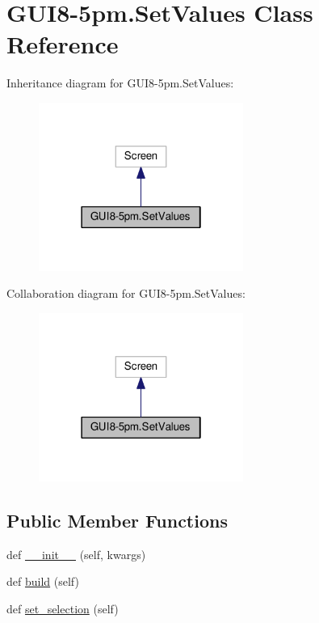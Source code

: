 \hypertarget{classGUI8-5pm_1_1SetValues}{}\section{G\+U\+I8-\/5pm.Set\+Values Class Reference}
\label{classGUI8-5pm_1_1SetValues}


Inheritance diagram for G\+U\+I8-\/5pm.Set\+Values\+:\nopagebreak
\begin{figure}[H]
\begin{center}
\leavevmode
\includegraphics[width=190pt]{classGUI8-5pm_1_1SetValues__inherit__graph}
\end{center}
\end{figure}


Collaboration diagram for G\+U\+I8-\/5pm.Set\+Values\+:\nopagebreak
\begin{figure}[H]
\begin{center}
\leavevmode
\includegraphics[width=190pt]{classGUI8-5pm_1_1SetValues__coll__graph}
\end{center}
\end{figure}
\subsection*{Public Member Functions}
\begin{DoxyCompactItemize}
\item 
def \hyperlink{classGUI8-5pm_1_1SetValues_afe186284aaf655e182eb4a0db6ad88c2}{\+\_\+\+\_\+init\+\_\+\+\_\+} (self, kwargs)
\item 
def \hyperlink{classGUI8-5pm_1_1SetValues_a439aa024ea8ca42f77bb95c0fd031f6b}{build} (self)
\item 
def \hyperlink{classGUI8-5pm_1_1SetValues_a1b4d3278b51b233ef6be6648162cb5ca}{set\+\_\+selection} (self)
\end{DoxyCompactItemize}
